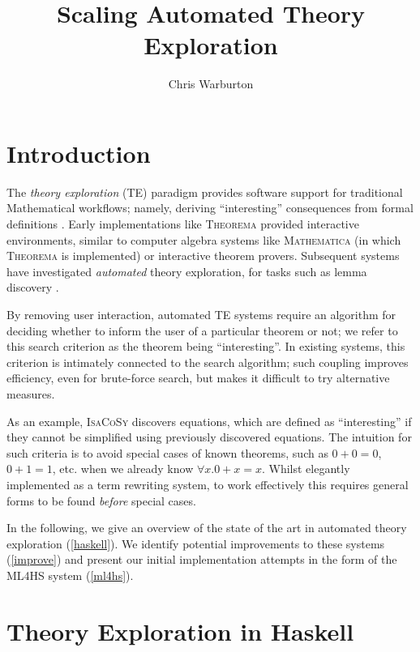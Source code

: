 \documentclass{eceasst}
\title{Scaling Automated Theory Exploration} %
\author{Chris Warburton\sponsor{}} %
\institute{ %
\email{cmwarburton@dundee.ac.uk}\\
School of Computing\\
University of Dundee}
\begin{document}
\maketitle

\section{Introduction}

The \emph{theory exploration} (TE) paradigm provides software support
for traditional Mathematical workflows; namely, deriving ``interesting''
consequences from formal definitions \cite{RISC1482}. Early
implementations like \textsc{Theorema} \cite{buchberger2000theory} provided
interactive environments, similar to computer algebra systems like
\textsc{Mathematica} (in which \textsc{Theorema} is implemented) or
interactive theorem provers. Subsequent systems have investigated
\emph{automated} theory exploration, for tasks such as lemma discovery
\cite{Hipster}.

By removing user interaction, automated TE systems require an algorithm
for deciding whether to inform the user of a particular theorem or not; we refer
to this search criterion as the theorem being ``interesting''. In existing
systems, this criterion is intimately connected to the
search algorithm; such coupling improves efficiency, even for brute-force
search, but makes it difficult to try alternative measures.

As an example, \textsc{IsaCoSy} \cite{johansson2009isacosy} discovers
equations, which are defined as ``interesting'' if they cannot be simplified
using previously discovered equations. The intuition for such criteria is to
avoid special cases of known theorems, such as $0 + 0 = 0$, $0 + 1 = 1$,
etc. when we already know $\forall x. 0 + x = x$. Whilst elegantly implemented
as a term rewriting system, to work effectively this requires general forms to
be found \emph{before} special cases.

In the following, we give an overview of the state of the art in automated
theory exploration (\autoref{haskell}). We identify potential improvements to
these systems (\autoref{improve}) and present our initial implementation
attempts in the form of the \textsc{ML4HS} system (\autoref{ml4hs}).

\section{Theory Exploration in Haskell}\label{haskell}
\end{document}
